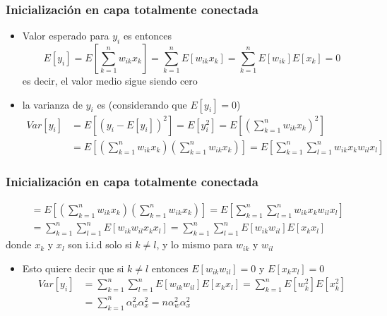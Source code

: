 \documentclass[svgnames,12pt,aspectratio=149]{beamer}
\begin{document}
\begin{frame}
  \frametitle{Inicialización en capa totalmente conectada}
\begin{itemize}
 \item Valor esperado para $y_i$ es entonces
 \begin{equation*}
 E\left[   y_i  \right]= E\left[   \sum_{k=1}^n w_{ik}x_k    \right]=\sum_{k=1}^n E\left[ w_{ik} x_k  \right] =\sum_{k=1}^n E\left[ w_{ik}\right] E\left[ x_k  \right]=0
 \end{equation*}
 es decir, el valor medio sigue siendo cero
 \item la varianza de $y_i$ es (considerando que $E[y_i]=0$)
  \begin{equation*}
  \begin{split}
  Var[y_i]& = E\left[  (y_i-E[y_i])^2   \right] = E [y_i^2]= E\left[ \left(  \sum_{k=1}^n w_{ik} x_k \right)^2  \right]\\
  & = E\left[ \left(  \sum_{k=1}^n w_{ik} x_k \right) \left(  \sum_{k=1}^n w_{ik} x_k \right)  \right]=E\left[\sum_{k=1}^n \sum_{l=1}^n  w_{ik} x_k w_{il} x_l \right] 
  \end{split}
 \end{equation*}

 \end{itemize}
  
\end{frame}
\begin{frame}
  \frametitle{Inicialización en capa totalmente conectada}

  \begin{equation*}
  \begin{split}
  & = E\left[ \left(  \sum_{k=1}^n w_{ik} x_k \right) \left(  \sum_{k=1}^n w_{ik} x_k \right)  \right]=E\left[\sum_{k=1}^n \sum_{l=1}^n  w_{ik} x_k w_{il} x_l \right]\\
   &= \sum_{k=1}^n \sum_{l=1}^n E\left[w_{ik}  w_{il} x_k x_l \right] =\sum_{k=1}^n \sum_{l=1}^n E\left[w_{ik}w_{il} \right]E\left[  x_k x_l \right]
  \end{split}
 \end{equation*}
donde $x_k$ y $x_l$ son i.i.d solo si $k\neq l$, y lo mismo para $w_{ik}$ y $w_{il}$
\begin{itemize}
\item Esto quiere decir que si $k\neq l$ entonces $E[w_{ik}w_{il} ]=0$ y $E[x_k x_l ]=0$ 
\begin{equation*}
  \begin{split}
Var[y_i] & = \sum_{k=1}^n \sum_{l=1}^n E\left[w_{ik}w_{il} \right]E\left[  x_k x_l \right]=\sum_{k=1}^n E\left[w_{k}^2\right] E\left[  x_k^2\right]\\
& = \sum_{k=1}^n \alpha^2_w \alpha^2_x=n \alpha^2_w \alpha^2_x
\end{split}
\end{equation*}
\end{itemize}
\end{frame}
\end{document}

